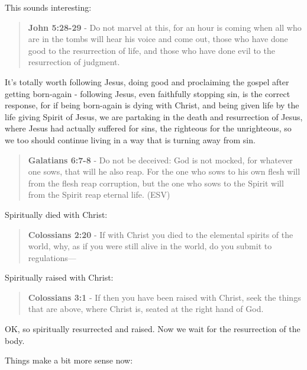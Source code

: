 \documentclass[11pt]{article}
\begin{document}
This sounds interesting:

\begin{quote}
\textbf{John 5:28-29} - Do not marvel at this, for an hour is coming when all who are in the tombs will hear his voice and come out, those who have done good to the resurrection of life, and those who have done evil to the resurrection of judgment.
\end{quote}

It's totally worth following Jesus, doing good and proclaiming the gospel after getting born-again - following Jesus, even faithfully stopping sin, is the correct response,
for if being born-again is dying with Christ, and being given life by the life giving Spirit of Jesus,
we are partaking in the death and resurrection of Jesus, where Jesus had actually suffered for sins, the righteous for the unrighteous, so we too should continue living in a way that is turning away from sin.

\begin{quote}
\textbf{Galatians 6:7-8} - Do not be deceived: God is not mocked, for whatever one sows, that will he also reap. For the one who sows to his own flesh will from the flesh reap corruption, but the one who sows to the Spirit will from the Spirit reap eternal life. (ESV)
\end{quote}

Spiritually died with Christ:

\begin{quote}
\textbf{Colossians 2:20} - If with Christ you died to the elemental spirits of the world, why, as if you were still alive in the world, do you submit to regulations—
\end{quote}

Spiritually raised with Christ:

\begin{quote}
\textbf{Colossians 3:1} - If then you have been raised with Christ, seek the things that are above, where Christ is, seated at the right hand of God.
\end{quote}

OK, so spiritually resurrected and raised. Now we wait for the resurrection of the body.

Things make a bit more sense now:
\end{document}
